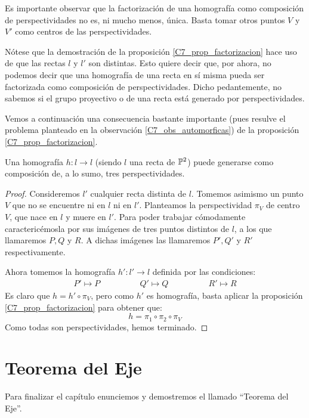 \begin{obs}
	Es importante observar que la factorización de una homografía como composición de perspectividades no es, ni mucho menos, única. Basta tomar otros puntos $V$ y $V'$ como centros de las perspectividades.
\end{obs}
\begin{obs}
	\label{C7_obs_automorficas}
	Nótese que la demostración de la proposición \ref{C7_prop_factorizacion} hace uso de que las rectas $l$ y $l'$ son distintas. Esto quiere decir que, por ahora, no podemos decir que una homografía de una recta en sí misma pueda ser factorizada como composición de perspectividades. Dicho pedantemente, no sabemos si el grupo proyectivo o  de una recta está generado por perspectividades.
\end{obs}
Vemos a continuación una consecuencia bastante importante (pues resulve el problema planteado en la observación \ref{C7_obs_automorficas}) de la proposición \ref{C7_prop_factorizacion}.
\begin{cor}
	Una homografía $h:l\to l$ (siendo $l$ una recta de $\mathbb{P}^2$) puede generarse como composición de, a lo sumo, tres perspectividades.
\end{cor}
\begin{proof}
	Consideremos $l'$ cualquier recta distinta de $l$. Tomemos asimismo un punto $V$ que no se encuentre ni en $l$ ni en $l'$. Planteamos la perspectividad $\pi_V$ de centro $V$, que nace en $l$ y muere en $l'$. Para poder trabajar cómodamente caractericémosla por sus imágenes de tres puntos distintos de $l$, a los que llamaremos $P,Q$ y $R$. A dichas imágenes las llamaremos $P',Q'$ y $R'$ respectivamente.
	
	Ahora tomemos la homografía $h':l'\to l$ definida por las condiciones:
	\[\begin{array}{ccc}
	P'\mapsto P\qquad&\qquad
	Q'\mapsto Q\qquad&\qquad
	R'\mapsto R
	\end{array}\]
	Es claro que $h=h'\circ\pi_V$, pero como $h'$ es homografía, basta aplicar la proposición \ref{C7_prop_factorizacion} para obtener que:
	\[h=\pi_1\circ\pi_2\circ\pi_V\]
	Como todas son perspectividades, hemos terminado.
\end{proof}
\section{Teorema del Eje}
\label{C7_Eje}
Para finalizar el capítulo enunciemos y demostremos el llamado ``Teorema del Eje''.

